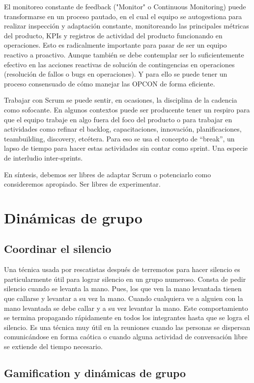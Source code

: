 El monitoreo constante de feedback ("Monitor" o Continuous Monitoring) puede transformarse en un proceso pautado, en el cual el equipo se autogestiona para realizar inspección y adaptación constante, monitoreando las principales métricas del producto, KPIs y registros de actividad del producto funcionando en operaciones. Esto es radicalmente importante para pasar de ser un equipo reactivo a proactivo. Aunque también se debe contemplar ser lo suficientemente efectivo en las acciones reactivas de solución de contingencias en operaciones (resolución de fallos o bugs en operaciones). Y para ello se puede tener un proceso consensuado de cómo manejar las OPCON de forma eficiente.

Trabajar con Scrum se puede sentir, en ocasiones, la disciplina de la cadencia como sofocante. En algunos contextos puede ser producente tener un respiro para que el equipo trabaje en algo fuera del foco del producto o para trabajar en actividades como refinar el backlog, capacitaciones, innovación, planificaciones, teambuilding, discovery, etcétera. Para eso se usa el concepto de “break”, un lapso de tiempo para hacer estas actividades sin contar como sprint. Una especie de interludio inter-sprints.

En síntesis, debemos ser libres de adaptar Scrum o potenciarlo como consideremos apropiado. Ser libres de experimentar.

\newpage
\section{Dinámicas de grupo}
\subsection{Coordinar el silencio}

Una técnica usada por rescatistas después de terremotos para hacer silencio es particularmente útil para lograr silencio en un grupo numeroso. Consta de pedir silencio cuando se levanta la mano. Pues, los que ven la mano levantada tienen que callarse y levantar a su vez la mano. Cuando cualquiera ve a alguien con la mano levantada se debe callar y a su vez levantar la mano. Este comportamiento se termina propagando rápidamente en todos los integrantes hasta que se logra el silencio. Es una técnica muy útil en la reuniones cuando las personas se dispersan comunicándose en forma caótica o cuando alguna actividad de conversación libre se extiende del tiempo necesario.

\subsection{Gamification y dinámicas de grupo}

